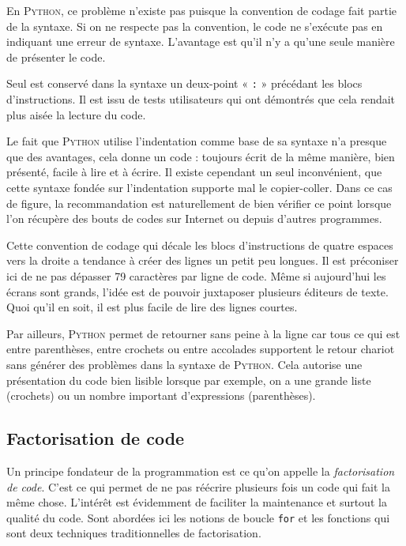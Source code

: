En \textsc{Python}, ce problème n'existe pas puisque la convention de codage fait partie de la syntaxe. Si on ne respecte pas la convention, le code ne s'exécute pas en indiquant une erreur de syntaxe. L'avantage est qu'il n'y a qu'une seule manière de présenter le code.

Seul est conservé dans la syntaxe un deux-point « \texttt{:} » précédant les blocs d'instructions. Il est issu de tests utilisateurs qui ont démontrés que cela rendait plus aisée la lecture du code.

Le fait que \textsc{Python} utilise l'indentation comme base de sa syntaxe n'a presque que des avantages, cela donne un code : toujours écrit de la même manière, bien présenté, facile à lire et à écrire. Il existe cependant un seul inconvénient, que cette syntaxe fondée sur l'indentation supporte mal le copier-coller. Dans ce cas de figure, la recommandation est naturellement de bien vérifier ce point lorsque l'on récupère des bouts de codes sur Internet ou depuis d'autres programmes.

Cette convention de codage qui décale les blocs d'instructions de quatre espaces vers la droite a tendance à créer des lignes un petit peu longues. Il est préconiser ici de ne pas dépasser 79 caractères par ligne de code. Même si aujourd'hui les écrans sont grands, l'idée est de pouvoir juxtaposer plusieurs éditeurs de texte. Quoi qu'il en soit, il est plus facile de lire des lignes courtes.

Par ailleurs, \textsc{Python} permet de retourner sans peine à la ligne car tous ce qui est entre parenthèses, entre crochets ou entre accolades supportent le retour chariot sans générer des problèmes dans la syntaxe de \textsc{Python}. Cela autorise une présentation du code bien lisible lorsque par exemple, on a une grande liste (crochets) ou un nombre important d'expressions (parenthèses).


\subsection[Factorisation de code]{Factorisation de code}
\label{sub:XI.3.2}

Un principe fondateur de la programmation est ce qu'on appelle la \emph{factorisation de code}. C'est ce qui permet de ne pas réécrire plusieurs fois un code qui fait la même chose. L'intérêt est évidemment de faciliter la maintenance et surtout la qualité du code. Sont abordées ici les notions de boucle \texttt{for} et les fonctions qui sont deux techniques traditionnelles de factorisation.

